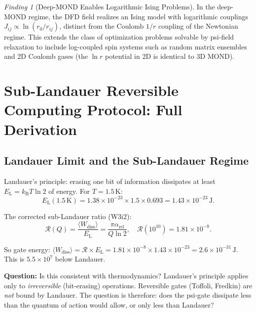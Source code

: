 \documentclass[11pt]{article}
\theoremstyle{definition}
\theoremstyle{remark}
\newtheorem{finding}[theorem]{Finding}
\newcommand{\kB}{k_{\mathrm{B}}}
\newcommand{\EL}{E_{\mathrm{L}}}
\newcommand{\arel}{\alpha_{\mathrm{rel}}}
\begin{document}
\begin{finding}[Deep-MOND Enables Logarithmic Ising Problems]
\label{find:log_ising}
In the deep-MOND regime, the DFD field realizes an Ising model with
logarithmic couplings $J_{ij}\propto\ln(r_0/r_{ij})$, distinct from the
Coulomb $1/r$ coupling of the Newtonian regime. This extends the class
of optimization problems solvable by psi-field relaxation to include
log-coupled spin systems such as random matrix ensembles and 2D Coulomb
gases (the $\ln r$ potential in 2D is identical to 3D MOND).
\end{finding}

\section{Sub-Landauer Reversible Computing Protocol: Full Derivation}
\label{sec:reversible_protocol}

\subsection{Landauer Limit and the Sub-Landauer Regime}

Landauer's principle: erasing one bit of information dissipates at least
$\EL = \kB T\ln 2$ of energy. For $T = 1.5\,\mathrm{K}$:
\begin{equation}
\EL(1.5\,\mathrm{K}) = 1.38\times10^{-23}\times1.5\times0.693
= 1.43\times10^{-23}\,\mathrm{J}.
\end{equation}

The corrected sub-Landauer ratio (W3i2):
\begin{equation}
\mathcal{R}(Q) = \frac{\langle W_{\mathrm{diss}}\rangle}{\EL}
= \frac{\pi\arel}{Q\ln2},
\quad \mathcal{R}(10^{10}) = 1.81\times10^{-8}.
\end{equation}

So gate energy: $\langle W_{\mathrm{diss}}\rangle = \mathcal{R}\times\EL
= 1.81\times10^{-8}\times1.43\times10^{-23} = 2.6\times10^{-31}\,\mathrm{J}$.
This is $5.5\times10^7$ below Landauer.

\textbf{Question:} Is this consistent with thermodynamics? Landauer's
principle applies only to \emph{irreversible} (bit-erasing) operations.
Reversible gates (Toffoli, Fredkin) are \emph{not} bound by Landauer. The
question is therefore: does the psi-gate dissipate less than the
quantum of action would allow, or only less than Landauer?
\end{document}
